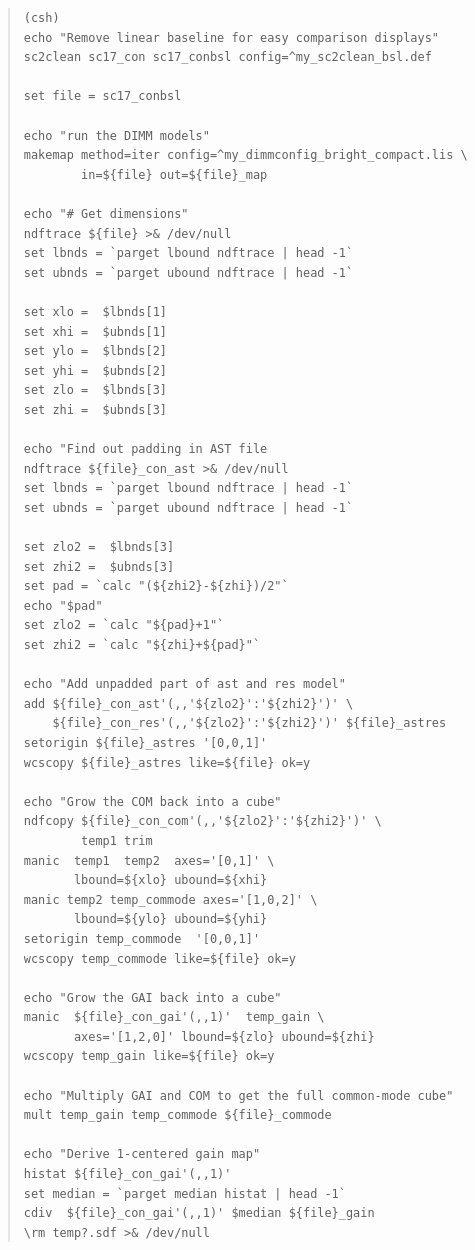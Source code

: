 \documentclass[twoside,11pt]{article}
\renewcommand{\_}{\texttt{\symbol{95}}}
\newenvironment{myquote}{\begin{quote}\begin{small}}{\end{small}\end{quote}}
\begin{document}
\begin{myquote}
\begin{verbatim}
(csh)
echo "Remove linear baseline for easy comparison displays"
sc2clean sc17_con sc17_conbsl config=^my_sc2clean_bsl.def

set file = sc17_conbsl

echo "run the DIMM models"
makemap method=iter config=^my_dimmconfig_bright_compact.lis \
        in=${file} out=${file}_map

echo "# Get dimensions"
ndftrace ${file} >& /dev/null
set lbnds = `parget lbound ndftrace | head -1`
set ubnds = `parget ubound ndftrace | head -1`

set xlo =  $lbnds[1]
set xhi =  $ubnds[1]
set ylo =  $lbnds[2]
set yhi =  $ubnds[2]
set zlo =  $lbnds[3]
set zhi =  $ubnds[3]

echo "Find out padding in AST file
ndftrace ${file}_con_ast >& /dev/null
set lbnds = `parget lbound ndftrace | head -1`
set ubnds = `parget ubound ndftrace | head -1`

set zlo2 =  $lbnds[3]
set zhi2 =  $ubnds[3]
set pad = `calc "(${zhi2}-${zhi})/2"`
echo "$pad"
set zlo2 = `calc "${pad}+1"`
set zhi2 = `calc "${zhi}+${pad}"`

echo "Add unpadded part of ast and res model"
add ${file}_con_ast'(,,'${zlo2}':'${zhi2}')' \
    ${file}_con_res'(,,'${zlo2}':'${zhi2}')' ${file}_astres
setorigin ${file}_astres '[0,0,1]'
wcscopy ${file}_astres like=${file} ok=y

echo "Grow the COM back into a cube"
ndfcopy ${file}_con_com'(,,'${zlo2}':'${zhi2}')' \
        temp1 trim
manic  temp1  temp2  axes='[0,1]' \
       lbound=${xlo} ubound=${xhi}
manic temp2 temp_commode axes='[1,0,2]' \
       lbound=${ylo} ubound=${yhi}
setorigin temp_commode  '[0,0,1]'
wcscopy temp_commode like=${file} ok=y

echo "Grow the GAI back into a cube"
manic  ${file}_con_gai'(,,1)'  temp_gain \
       axes='[1,2,0]' lbound=${zlo} ubound=${zhi}
wcscopy temp_gain like=${file} ok=y

echo "Multiply GAI and COM to get the full common-mode cube"
mult temp_gain temp_commode ${file}_commode

echo "Derive 1-centered gain map"
histat ${file}_con_gai'(,,1)'
set median = `parget median histat | head -1`
cdiv  ${file}_con_gai'(,,1)' $median ${file}_gain
\rm temp?.sdf >& /dev/null
\end{verbatim}
\end{myquote}

\newpage
\end{document}
